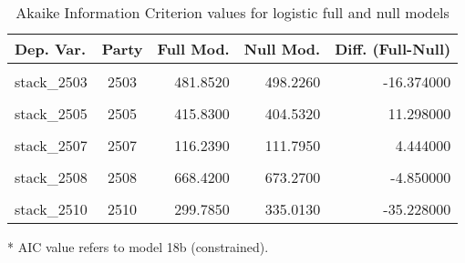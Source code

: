 \documentclass[
]{article}
\begin{document}
\begin{table}[!h]

\caption{\label{tab:unnamed-chunk-158}Akaike Information Criterion values for logistic full and null models 
        \label{table:logit_aic_sk}}
\centering
\begin{threeparttable}
\begin{tabular}[t]{lcrrr}
\toprule
Dep. Var. & Party & Full Mod. & Null Mod. & Diff. (Full-Null)\\
\midrule
\cellcolor{gray!6}{stack\_2501} & \cellcolor{gray!6}{2501} & \cellcolor{gray!6}{500.2010} & \cellcolor{gray!6}{488.3540} & \cellcolor{gray!6}{11.848000}\\
stack\_2503 & 2503 & 481.8520 & 498.2260 & -16.374000\\
\cellcolor{gray!6}{stack\_2504} & \cellcolor{gray!6}{2504} & \cellcolor{gray!6}{247.7260} & \cellcolor{gray!6}{237.3100} & \cellcolor{gray!6}{10.416000}\\
stack\_2505 & 2505 & 415.8300 & 404.5320 & 11.298000\\
\cellcolor{gray!6}{stack\_2506} & \cellcolor{gray!6}{2506} & \cellcolor{gray!6}{286.6800} & \cellcolor{gray!6}{278.1040} & \cellcolor{gray!6}{8.576000}\\
\addlinespace
stack\_2507 & 2507 & 116.2390 & 111.7950 & 4.444000\\
\cellcolor{gray!6}{stack\_2507*} & \cellcolor{gray!6}{2507} & \cellcolor{gray!6}{114.5204} & \cellcolor{gray!6}{111.7951} & \cellcolor{gray!6}{2.725274}\\
stack\_2508 & 2508 & 668.4200 & 673.2700 & -4.850000\\
\cellcolor{gray!6}{stack\_2509} & \cellcolor{gray!6}{2509} & \cellcolor{gray!6}{325.4510} & \cellcolor{gray!6}{310.2900} & \cellcolor{gray!6}{15.161000}\\
stack\_2510 & 2510 & 299.7850 & 335.0130 & -35.228000\\
\bottomrule
\end{tabular}
\begin{tablenotes}[para]
\item[*] AIC value refers to model 18b (constrained).
\end{tablenotes}
\end{threeparttable}
\end{table}
\end{document}
